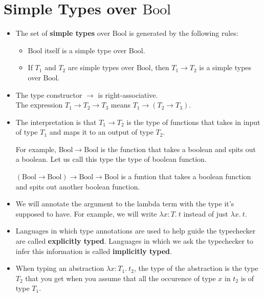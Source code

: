 \documentclass[10pt]{article}
\newcommand{\mrm}[1]{\mathrm{#1}}
\newcommand{\ra}{\rightarrow}
\newcommand{\Bool}{\mathrm{Bool}}
\begin{document}
	\section{Simple Types over $\mrm{Bool}$}
	
	  \begin{itemize}
	    \item The set of {\bf simple types} over $\mrm{Bool}$ is generated by the following rules:
	    \begin{itemize}
	      \item $\mrm{Bool}$ itself is a simple type over $\mrm{Bool}$.
	      \item If $T_1$ and $T_2$ are simple types over $\mrm{Bool}$, then $T_1 \rightarrow T_2$ is a simple
	        types over $\mrm{Bool}$.
	    \end{itemize}	  	    
	    \item The type constructor $\rightarrow$ is right-associative.\\
	      The expression $T_1 \rightarrow T_2 \rightarrow T_3$ means $T_1 \rightarrow (T_2 \rightarrow T_3)$.
	      
	    \item The interpretation is that $T_1 \ra T_2$ is the type of functions that takes in input of
	      type $T_1$ and maps it to an output of type $T_2$.
	      
	      For example, $\Bool \ra \Bool$ is the function that takes a boolean and spits out a boolean.
	      Let us call this type the type of boolean function.
	      
	      $(\Bool \ra \Bool) \ra \Bool \ra \Bool$ is a funtion that takes a boolean function
	      and spits out another boolean function.
	      
	    \item We will annotate the argument to the lambda term with the type it's supposed to have.
	      For example, we will write $\lambda x: T.\ t$ instead of just $\lambda x.\ t.$
	      
	    \item Languages in which type annotations are used to help guide the typechecker are called
	      {\bf explicitly typed}. Languages in which we ask the typechecker to infer this information
	      is called {\bf implicitly typed}.
	      
	    \item When typing an abstraction $\lambda x : T_1.\ t_2$, the type of the abstraction
	      is the type $T_2$ that you get when you assume that all the occurence of type $x$ in $t_2$
	      is of type $T_1$.
	      

\end{itemize}
\end{document}
